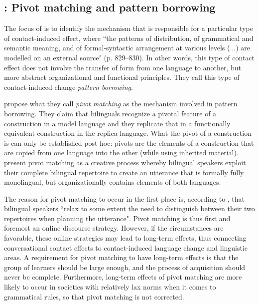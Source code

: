 \documentclass[output=paper]{langscibook}
\begin{document}
\subsection{\citet{matras&sakel2007}: Pivot matching and pattern borrowing}

The focus of \textcite{matras&sakel2007} is to identify the mechanism that is responsible for a particular type of contact-induced effect, where ``the patterns of distribution, of grammatical and semantic meaning, and of formal-syntactic arrangement at various levels (...) are modelled on an external source" (p. 829--830). In other words, this type of contact effect does not involve the transfer of form from one language to another, but more abstract organizational and functional principles. They call this type of contact-induced change \emph{pattern borrowing}.

\textcite{matras&sakel2007} propose what they call \emph{pivot matching} as the mechanism involved in pattern borrowing. They claim that bilinguals recognize a pivotal feature  of a construction in a model language and they replicate that in a functionally equivalent construction in the replica language. What the pivot of a construction is can only be established post-hoc: pivots are the elements of a construction that are copied from one language into the other (while using inherited material). \textcite{matras&sakel2007} present pivot matching as a creative process whereby bilingual speakers exploit their complete bilingual repertoire to create an utterance that is formally fully monolingual, but organizationally contains elements of both languages.

The reason for pivot matching to occur in the first place is, according to \textcite[832]{matras&sakel2007}, that bilingual speakers ``relax to some extent the need to distinguish
between their two repertoires when planning the utterance". Pivot matching is thus first and foremost an online discourse strategy. However, if the circumstances are favorable, these online strategies may lead to long-term effects, thus connecting conversational contact effects to contact-induced language change and linguistic areas. A requirement for pivot matching to have long-term effects is that the group of learners should be large enough, and the process of acquisition should never be complete. Furthermore, long-term effects of pivot matching are more likely to occur in societies with relatively lax norms when it comes to grammatical rules, so that pivot matching is not corrected.
\end{document}
